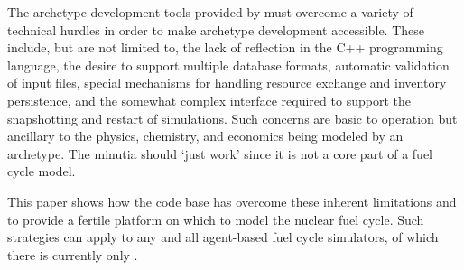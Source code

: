 The archetype development tools provided by \cyclus must overcome a variety of 
technical hurdles in order to make archetype development accessible.  These 
include, but are not limited to, the lack of reflection in the C++ programming language, 
the desire to support multiple database formats, automatic validation of input files,
special mechanisms for handling resource exchange and inventory persistence, 
and the somewhat complex interface required to support the snapshotting and 
restart of simulations. Such concerns are basic to \cyclus operation but 
ancillary to the physics, chemistry, and economics being modeled by an archetype.
The minutia should `just work' since it is not a core part of a fuel cycle model.

This paper shows how the \cyclus code base has overcome these inherent limitations
and to provide a fertile platform on which to model the nuclear fuel cycle.
Such strategies can apply to any and all agent-based fuel cycle simulators, of which 
there is currently only \cyclus.
